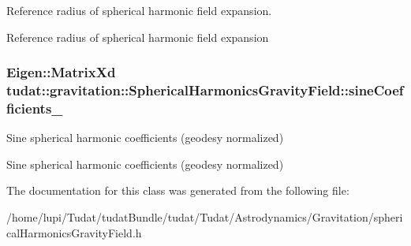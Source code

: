 Reference radius of spherical harmonic field expansion. 

Reference radius of spherical harmonic field expansion 
\subsubsection[{\texorpdfstring{sine\+Coefficients\+\_\+}{sineCoefficients_}}]{\setlength{\rightskip}{0pt plus 5cm}Eigen\+::\+Matrix\+Xd tudat\+::gravitation\+::\+Spherical\+Harmonics\+Gravity\+Field\+::sine\+Coefficients\+\_\+\hspace{0.3cm}{\ttfamily [protected]}}\hypertarget{classtudat_1_1gravitation_1_1SphericalHarmonicsGravityField_accb57f8fd5997a24737fbadf9341e3b0}{}\label{classtudat_1_1gravitation_1_1SphericalHarmonicsGravityField_accb57f8fd5997a24737fbadf9341e3b0}


Sine spherical harmonic coefficients (geodesy normalized) 

Sine spherical harmonic coefficients (geodesy normalized) 

The documentation for this class was generated from the following file\+:\begin{DoxyCompactItemize}
\item 
/home/lupi/\+Tudat/tudat\+Bundle/tudat/\+Tudat/\+Astrodynamics/\+Gravitation/spherical\+Harmonics\+Gravity\+Field.\+h\end{DoxyCompactItemize}
